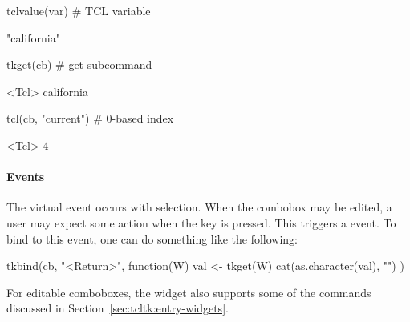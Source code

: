 \begin{Schunk}
\begin{Sinput}
 tclvalue(var)                           # TCL variable
\end{Sinput}
\begin{Soutput}
[1] "california"
\end{Soutput}
\begin{Sinput}
 tkget(cb)                               # get subcommand
\end{Sinput}
\begin{Soutput}
<Tcl> california 
\end{Soutput}
\begin{Sinput}
 tcl(cb, "current")                      # 0-based index
\end{Sinput}
\begin{Soutput}
<Tcl> 4 
\end{Soutput}
\end{Schunk}


\paragraph{Events}
The virtual event  occurs with
selection. When the combobox may be edited, a user may expect some
action when the  key is pressed. This triggers a
 event. To bind to this event, one can do something
like the following:

\begin{Schunk}
\begin{Sinput}
 tkbind(cb, "<Return>", function(W) {
   val <- tkget(W)
   cat(as.character(val), "\n")
 })
\end{Sinput}
\end{Schunk}

For editable comboboxes, the widget also supports some of the
 commands discussed in
Section~\ref{sec:tcltk:entry-widgets}.






